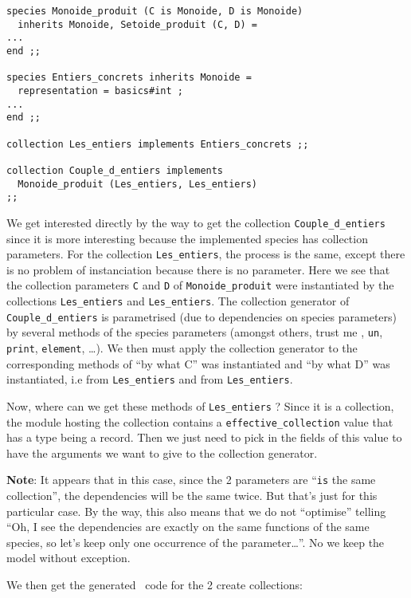 {\footnotesize
\begin{lstlisting}[title=More \focalize\ code to create collections]
species Monoide_produit (C is Monoide, D is Monoide)
  inherits Monoide, Setoide_produit (C, D) =
...
end ;;

species Entiers_concrets inherits Monoide =
  representation = basics#int ;
...
end ;;

collection Les_entiers implements Entiers_concrets ;;

collection Couple_d_entiers implements
  Monoide_produit (Les_entiers, Les_entiers)
;;
\end{lstlisting}
}
We get interested directly by the way to get the collection
{\tt Couple\_d\_entiers} since it is more interesting because the
implemented species has collection parameters. For the collection
{\tt Les\_entiers}, the process is the same, except there is no
problem of instanciation because there is no parameter.
Here we see that the collection parameters {\tt C} and {\tt D} of
{\tt Monoide\_produit} were instantiated by the collections
{\tt Les\_entiers} and {\tt Les\_entiers}. The collection generator of
{\tt Couple\_d\_entiers} is parametrised (due to dependencies on
species parameters) by several methods of the species parameters
(amongst others, trust me \smiley, {\tt un}, {\tt print},
{\tt element}, \ldots).
We then must apply the collection generator to the corresponding
methods of ``by what C'' was instantiated and ``by what D'' was
instantiated, i.e from {\tt Les\_entiers} and from
{\tt Les\_entiers}.

Now, where can we get these methods of {\tt Les\_entiers} ? Since it is
a collection, the module hosting the collection contains a
{\tt effective\_collection} value that has a type being a record. Then
we just need to pick in the fields of this value to have the arguments
we want to give to the collection generator.

\medskip
{\bf Note}: It appears that in this case, since the 2
parameters are ``{\tt is} the same collection'', the dependencies will
be the same twice. But that's just for this particular case. By the
way, this also means that we do not ``optimise'' telling ``Oh, I see
the dependencies are exactly on the same functions of the same species,
so let's keep only one occurrence of the parameter\ldots''. No we keep
the model without exception.

We then get the generated \ocaml\ code for the 2 create collections:

